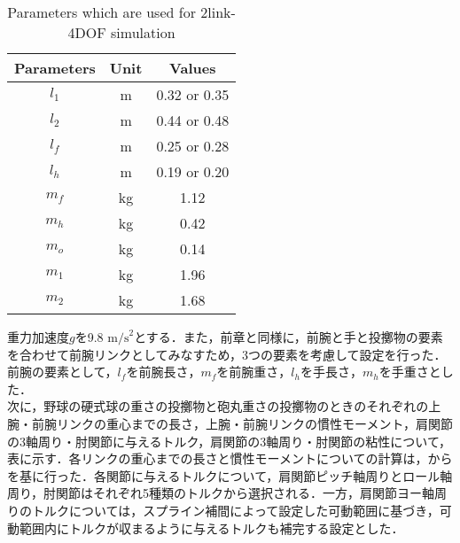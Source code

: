 \begin{table}[tb]
  \begin{center}
    \caption{Parameters which are used for 2link-4DOF simulation}
    \begin{tabular}{c|c|c}
      \hline
      Parameters & Unit & Values \\
      \hline
      $l_{1}$ & m & 0.32 or 0.35 \\
      $l_{2}$ & m & 0.44 or 0.48 \\
      $l_{f}$ & m & 0.25 or 0.28 \\
      $l_{h}$ & m & 0.19 or 0.20 \\
      $m_{f}$ & kg & 1.12 \\
      $m_{h}$ & kg & 0.42 \\
      $m_{o}$ & kg & 0.14 \\
      $m_{1}$ & kg & 1.96 \\
      $m_{2}$ & kg & 1.68 \\
      \hline
    \end{tabular}
  \end{center}
\end{table}

重力加速度$g$を9.8 $\mathrm{m/s}^{2}$とする．また，前章と同様に，前腕と手と投擲物の要素を合わせて前腕リンクとしてみなすため，3つの要素を考慮して設定を行った．
前腕の要素として，$l_{f}$を前腕長さ，$m_{f}$を前腕重さ，$l_{h}$を手長さ，$m_{h}$を手重さとした．\\

次に，野球の硬式球の重さの投擲物と砲丸重さの投擲物のときのそれぞれの上腕・前腕リンクの重心までの長さ，上腕・前腕リンクの慣性モーメント，肩関節の3軸周り・肘関節に与えるトルク，肩関節の3軸周り・肘関節の粘性について，表に示す．各リンクの重心までの長さと慣性モーメントについての計算は，からを基に行った．各関節に与えるトルクについて，肩関節ピッチ軸周りとロール軸周り，肘関節はそれぞれ5種類のトルクから選択される．一方，肩関節ヨー軸周りのトルクについては，スプライン補間によって設定した可動範囲に基づき，可動範囲内にトルクが収まるように与えるトルクも補完する設定とした．

